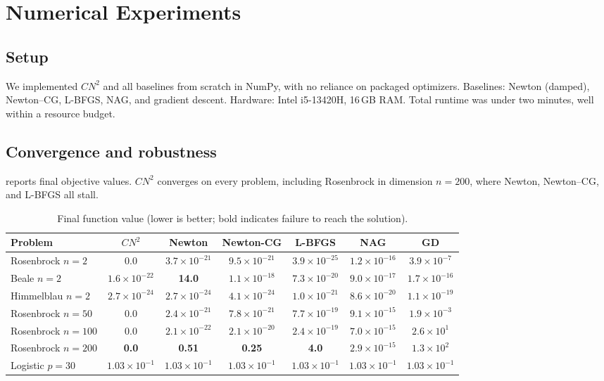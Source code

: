 \documentclass[11pt]{article}
\newcommand{\cn}{CN^2}
\begin{document}
\section{Numerical Experiments}
\label{sec:experiments}

\subsection{Setup}
We implemented $\cn$ and all baselines from scratch in NumPy, with no reliance on packaged
optimizers. Baselines: Newton (damped), Newton--CG, L-BFGS, NAG, and gradient descent.
Hardware: Intel i5-13420H, 16\,GB RAM. Total runtime was under two minutes, well within a
resource budget.

\subsection{Convergence and robustness}
 reports final objective values. $\cn$ converges on every problem, including
Rosenbrock in dimension $n=200$, where Newton, Newton--CG, and L-BFGS all stall.

\begin{table}[H]
\centering
\caption{Final function value (lower is better; bold indicates failure to reach the
solution).}
\label{tab:final}
\small
\begin{tabular}{lcccccc}
\toprule
Problem & $\cn$ & Newton & Newton-CG & L-BFGS & NAG & GD\\
\midrule
Rosenbrock $n{=}2$   & 0.0 & $3.7{\times}10^{-21}$ & $9.5{\times}10^{-21}$ & $3.9{\times}10^{-25}$ & $1.2{\times}10^{-16}$ & $3.9{\times}10^{-7}$\\
Beale $n{=}2$        & $1.6{\times}10^{-22}$ & \textbf{14.0} & $1.1{\times}10^{-18}$ & $7.3{\times}10^{-20}$ & $9.0{\times}10^{-17}$ & $1.7{\times}10^{-16}$\\
Himmelblau $n{=}2$   & $2.7{\times}10^{-24}$ & $2.7{\times}10^{-24}$ & $4.1{\times}10^{-24}$ & $1.0{\times}10^{-21}$ & $8.6{\times}10^{-20}$ & $1.1{\times}10^{-19}$\\
Rosenbrock $n{=}50$  & 0.0 & $2.4{\times}10^{-21}$ & $7.8{\times}10^{-21}$ & $7.7{\times}10^{-19}$ & $9.1{\times}10^{-15}$ & $1.9{\times}10^{-3}$\\
Rosenbrock $n{=}100$ & 0.0 & $2.1{\times}10^{-22}$ & $2.1{\times}10^{-20}$ & $2.4{\times}10^{-19}$ & $7.0{\times}10^{-15}$ & $2.6{\times}10^{1}$\\
Rosenbrock $n{=}200$ & \textbf{0.0} & \textbf{0.51} & \textbf{0.25} & \textbf{4.0} & $2.9{\times}10^{-15}$ & $1.3{\times}10^{2}$\\
Logistic $p{=}30$    & $1.03{\times}10^{-1}$ & $1.03{\times}10^{-1}$ & $1.03{\times}10^{-1}$ & $1.03{\times}10^{-1}$ & $1.03{\times}10^{-1}$ & $1.03{\times}10^{-1}$\\
\bottomrule
\end{tabular}
\end{table}
\end{document}
